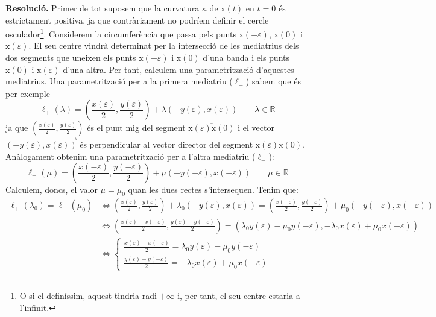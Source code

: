 \documentclass[10pt,a4paper]{article}
\newcommand{\vf}[1]{\boldsymbol{\mathrm{#1}}} %
\newcommand{\RR}{\ensuremath{\mathbb{R}}}
\theoremstyle{definition}
\begin{document}
\textbf{Resolució.} Primer de tot suposem que la curvatura $\kappa$ de $\vf{x}(t)$ en $t=0$ és estrictament positiva, ja que contràriament no podríem definir el cercle osculador\footnote{O si el definíssim, aquest tindria radi $+\infty$ i, per tant, el seu centre estaria a l'infinit.}. Considerem la circumferència que passa pels punts $\vf{x}(-\varepsilon)$, $\vf{x}(0)$ i $\vf{x}(\varepsilon)$. El seu centre vindrà determinat per la intersecció de les mediatrius dels dos segments que uneixen els punts $\vf{x}(-\varepsilon)$ i $\vf{x}(0)$ d'una banda i els punts $\vf{x}(0)$ i $\vf{x}(\varepsilon)$ d'una altra. Per tant, calculem una parametrització d'aquestes mediatrius. Una parametrització per a la primera mediatriu ($\ell_+$) sabem que és per exemple
$$\ell_+(\lambda)=\left(\frac{x(\varepsilon)}{2},\frac{y(\varepsilon)}{2}\right)+\lambda\left(-y(\varepsilon),x(\varepsilon)\right)\qquad \lambda\in\RR$$
ja que $\left(\frac{x(\varepsilon)}{2},\frac{y(\varepsilon)}{2}\right)$ és el punt mig del segment $\overline{\vf{x}(\varepsilon)\vf{x}(0)}$ i el vector $\overrightarrow{\left(-y(\varepsilon),x(\varepsilon)\right)}$ és perpendicular al vector director del segment $\overline{\vf{x}(\varepsilon)\vf{x}(0)}$. Anàlogament obtenim una parametrització per a l'altra mediatriu ($\ell_-$):
\begin{equation}\label{ell-}
  \ell_-(\mu)=\left(\frac{x(-\varepsilon)}{2},\frac{y(-\varepsilon)}{2}\right)+\mu\left(-y(-\varepsilon),x(-\varepsilon)\right)\qquad \mu\in\RR
\end{equation}
Calculem, doncs, el valor $\mu=\mu_0$ quan les dues rectes s'intersequen. Tenim que:
\begin{align}\label{intersec}
  \nonumber\ell_+(\lambda_0)=\ell_-(\mu_0) & \iff \left(\frac{x(\varepsilon)}{2},\frac{y(\varepsilon)}{2}\right)+\lambda_0\left(-y(\varepsilon),x(\varepsilon)\right)=\left(\frac{x(-\varepsilon)}{2},\frac{y(-\varepsilon)}{2}\right)+\mu_0\left(-y(-\varepsilon),x(-\varepsilon)\right) \\
  \nonumber                                & \iff  \left(\frac{x(\varepsilon)-x(-\varepsilon)}{2},\frac{y(\varepsilon)-y(-\varepsilon)}{2}\right)=\left(\lambda_0y(\varepsilon)-\mu_0y(-\varepsilon),-\lambda_0x(\varepsilon)+\mu_0x(-\varepsilon)\right)                                 \\
                                           & \iff\left\{
  \begin{array}{l}
    \frac{x(\varepsilon)-x(-\varepsilon)}{2}=\lambda_0y(\varepsilon)-\mu_0y(-\varepsilon) \\
    \frac{y(\varepsilon)-y(-\varepsilon)}{2}=-\lambda_0x(\varepsilon)+\mu_0x(-\varepsilon)
  \end{array}\right.
\end{align}
\end{document}
